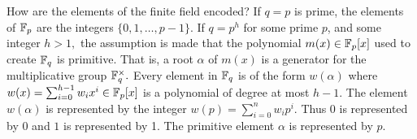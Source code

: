 How are the elements of the finite field encoded? If $q=p$ is prime, the elements of ${\mathbb F}_p$ are the integers 
$\{0,1,\ldots,p-1\}.$ If $q = p^h$ for some prime $p$, and some integer $h > 1,$ 
the assumption is made that the polynomial $m(x)\in {\mathbb F}_p[x]$ 
used to create ${\mathbb F}_q$ is primitive. That is, a root $\alpha$ of $m(x)$ is a generator for the multiplicative 
group ${\mathbb F}_q^\times.$ 
Every element in ${\mathbb F}_q$ is of the form $w(\alpha)$ where 
$w(x) = \sum_{i=0}^{h-1} w_i x^i \in {\mathbb F}_p[x]$ is a polynomial of degree 
at most $h-1.$ The element $w(\alpha)$ is represented by the integer $w(p) = \sum_{i=0}^{n}w_i p^i.$ 
Thus $0$ is represented by $0$ and $1$ is represented by 1. 
The primitive element $\alpha$ is represented by $p$.






